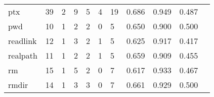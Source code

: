 \begin{longtable}{lp{1.2cm}p{1.2cm}p{1.2cm}p{1.2cm}p{1.2cm}p{1.2cm}p{1.2cm}p{1.2cm}p{1.2cm}p{1.2cm}}
ptx       &                                    39 &                                                  2 &                                                  9 &                                                  5 &                                                  4 &                                                 19 &                                         0.686 &                                              0.949 &                                              0.487 \\
pwd       &                                    10 &                                                  1 &                                                  2 &                                                  2 &                                                  0 &                                                  5 &                                         0.650 &                                              0.900 &                                              0.500 \\
readlink  &                                    12 &                                                  1 &                                                  3 &                                                  2 &                                                  1 &                                                  5 &                                         0.625 &                                              0.917 &                                              0.417 \\
realpath  &                                    11 &                                                  1 &                                                  2 &                                                  2 &                                                  1 &                                                  5 &                                         0.659 &                                              0.909 &                                              0.455 \\
rm        &                                    15 &                                                  1 &                                                  5 &                                                  2 &                                                  0 &                                                  7 &                                         0.617 &                                              0.933 &                                              0.467 \\
rmdir     &                                    14 &                                                  1 &                                                  3 &                                                  3 &                                                  0 &                                                  7 &                                         0.661 &                                              0.929 &                                              0.500 \\

\end{longtable}
